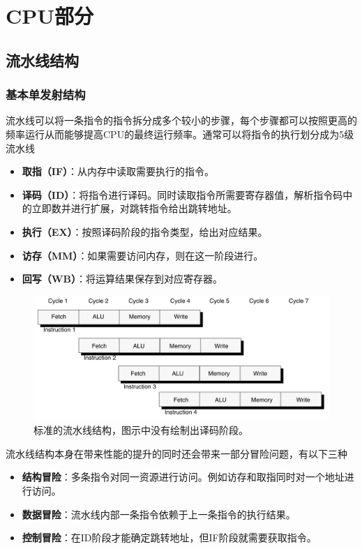 \chapter{CPU部分}

\section{流水线结构}
\subsection{基本单发射结构}
流水线可以将一条指令的指令拆分成多个较小的步骤，每个步骤都可以按照更高的频率运行从而能够提高CPU的最终运行频率。通常可以将指令的执行划分成为5级流水线
\begin{itemize}
	\item \textbf{取指（IF）}：从内存中读取需要执行的指令。
	\item \textbf{译码（ID）}：将指令进行译码。同时读取指令所需要寄存器值，解析指令码中的立即数并进行扩展，对跳转指令给出跳转地址。
	\item \textbf{执行（EX）}：按照译码阶段的指令类型，给出对应结果。
	\item \textbf{访存（MM）}：如果需要访问内存，则在这一阶段进行。
	\item \textbf{回写（WB）}：将运算结果保存到对应寄存器。
\end{itemize}

\begin{figure}[htbp]
	\centering
	\includegraphics[width=\linewidth]{standard-pipeline.png}
	\caption{标准的流水线结构，图示中没有绘制出译码阶段。}
	\label{fig:standard-pipeline}
\end{figure}

流水线结构本身在带来性能的提升的同时还会带来一部分冒险问题，有以下三种
\begin{itemize}
	\item \textbf{结构冒险}：多条指令对同一资源进行访问。例如访存和取指同时对一个地址进行访问。
	\item \textbf{数据冒险}：流水线内部一条指令依赖于上一条指令的执行结果。
	\item \textbf{控制冒险}：在ID阶段才能确定跳转地址，但IF阶段就需要获取指令。
\end{itemize}

